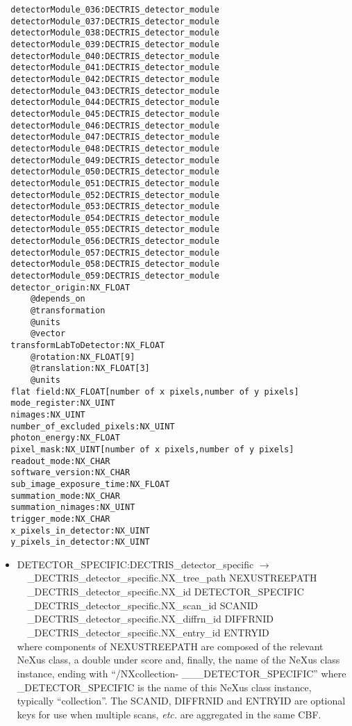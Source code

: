 \documentclass[11pt]{article}
\begin{document}
{{\begin{verbatim}
  detectorModule_036:DECTRIS_detector_module
  detectorModule_037:DECTRIS_detector_module
  detectorModule_038:DECTRIS_detector_module
  detectorModule_039:DECTRIS_detector_module
  detectorModule_040:DECTRIS_detector_module
  detectorModule_041:DECTRIS_detector_module
  detectorModule_042:DECTRIS_detector_module
  detectorModule_043:DECTRIS_detector_module
  detectorModule_044:DECTRIS_detector_module
  detectorModule_045:DECTRIS_detector_module
  detectorModule_046:DECTRIS_detector_module
  detectorModule_047:DECTRIS_detector_module
  detectorModule_048:DECTRIS_detector_module
  detectorModule_049:DECTRIS_detector_module
  detectorModule_050:DECTRIS_detector_module
  detectorModule_051:DECTRIS_detector_module
  detectorModule_052:DECTRIS_detector_module
  detectorModule_053:DECTRIS_detector_module
  detectorModule_054:DECTRIS_detector_module
  detectorModule_055:DECTRIS_detector_module
  detectorModule_056:DECTRIS_detector_module
  detectorModule_057:DECTRIS_detector_module
  detectorModule_058:DECTRIS_detector_module
  detectorModule_059:DECTRIS_detector_module
  detector_origin:NX_FLOAT
      @depends_on
      @transformation
      @units
      @vector
  transformLabToDetector:NX_FLOAT
      @rotation:NX_FLOAT[9]
      @translation:NX_FLOAT[3]
      @units
  flat field:NX_FLOAT[number of x pixels,number of y pixels]
  mode_register:NX_UINT
  nimages:NX_UINT
  number_of_excluded_pixels:NX_UINT
  photon_energy:NX_FLOAT
  pixel_mask:NX_UINT[number of x pixels,number of y pixels]
  readout_mode:NX_CHAR
  software_version:NX_CHAR
  sub_image_exposure_time:NX_FLOAT
  summation_mode:NX_CHAR
  summation_nimages:NX_UINT
  trigger_mode:NX_CHAR
  x_pixels_in_detector:NX_UINT
  y_pixels_in_detector:NX_UINT
\end{verbatim}

\begin{itemize}

\item{DETECTOR\_SPECIFIC:DECTRIS\_detector\_specific $\rightarrow$\\
\verb|  |\_DECTRIS\_detector\_specific.NX\_tree\_path    NEXUSTREEPATH \\
\verb|  |\_DECTRIS\_detector\_specific.NX\_id            DETECTOR\_SPECIFIC \\
\verb|  |\_DECTRIS\_detector\_specific.NX\_scan\_id      SCANID \\
\verb|  |\_DECTRIS\_detector\_specific.NX\_diffrn\_id    DIFFRNID \\
\verb|  |\_DECTRIS\_detector\_specific.NX\_entry\_id     ENTRYID \\
where components of NEXUSTREEPATH are composed of the
relevant NeXus class, a double under score and, finally, the
name of the NeXus class instance, ending with ``/NXcollection- \_\_\_DETECTOR\_SPECIFIC''
where \_DETECTOR\_SPECIFIC is the name of this NeXus class instance, typically ``collection''.
The SCANID, DIFFRNID and ENTRYID are optional keys for use
when multiple scans, {\it etc.} are aggregated in the same CBF.}


\end{itemize}}}
\end{document}
